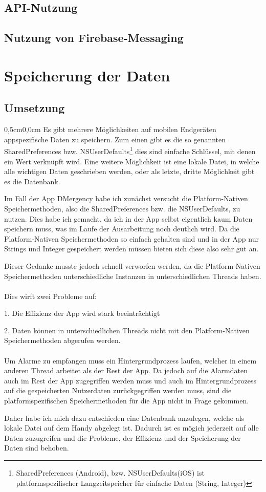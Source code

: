 \documentclass{article}
\begin{document}
\subsection{API-Nutzung}
\subsection{Nutzung von Firebase-Messaging}
\section{Speicherung der Daten}
\subsection{Umsetzung}
\begin{changemargin}{0,5cm}{0,0cm}
    Es gibt mehrere Möglichkeiten auf mobilen Endgeräten appspezifische Daten zu speichern.
    Zum einen gibt es die so genannten SharedPreferences bzw. NSUserDefaults\footnote{SharedPreferences (Android), bzw. NSUserDefaults(iOS) ist platformspezifischer Langzeitspeicher für einfache Daten (String, Integer)}
    dies sind einfache Schlüssel, mit denen ein Wert verknüpft wird.
    Eine weitere Möglichkeit ist eine lokale Datei, in welche alle wichtigen Daten geschrieben werden, oder als letzte, dritte Möglichkeit gibt es
    die Datenbank.

    Im Fall der App DMergency habe ich zunächst versucht die Platform-Nativen Speichermethoden, also die SharedPreferences bzw. die NSUserDefaults, zu nutzen.
    Dies habe ich gemacht, da ich in der App selbst eigentlich kaum Daten speichern muss, was im Laufe der Ausarbeitung noch deutlich wird.
    Da die Platform-Nativen Speichermethoden so einfach gehalten sind und in der App nur Strings und Integer gespeichert werden müssen bieten sich diese also sehr gut an.

    Dieser Gedanke musste jedoch schnell verworfen werden, da die Platform-Nativen Speichermethoden unterschiedliche Instanzen in unterschiedlichen Threads haben.
    \\
    \\Dies wirft zwei Probleme auf:
    \item 1. Die Effizienz der App wird stark beeinträchtigt
    \item 2. Daten können in unterschiedlichen Threads nicht mit den Platform-Nativen Speichermethoden abgerufen werden.
    \\\\Um Alarme zu empfangen muss ein Hintergrundprozess laufen, welcher in einem anderen Thread arbeitet als der Rest der App.
    Da jedoch auf die Alarmdaten auch im Rest der App zugegriffen werden muss und auch im Hintergrundprozess auf die gespeicherten Nutzerdaten zurückgegriffen werden muss, sind die
    platformspezifischen Speichermethoden für die App nicht in Frage gekommen.

    Daher habe ich mich dazu entschieden eine Datenbank anzulegen, welche als lokale Datei auf dem Handy abgelegt ist.
    Dadurch ist es mögich jederzeit auf alle Daten zuzugreifen und die Probleme, der Effizienz und der Speicherung der Daten sind behoben.
    

\end{changemargin}
\end{document}
